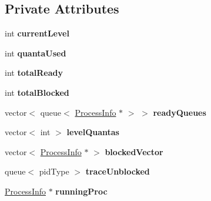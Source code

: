 \subsection*{\-Private \-Attributes}
\begin{DoxyCompactItemize}
\item 
\hypertarget{classcMultiLevel_afa779bba53744f5b3f7163c8558635ec}{int {\bfseries current\-Level}}\label{de/d3b/classcMultiLevel_afa779bba53744f5b3f7163c8558635ec}

\item 
\hypertarget{classcMultiLevel_a724793a54bbd81500c11b42e7401cf58}{int {\bfseries quanta\-Used}}\label{de/d3b/classcMultiLevel_a724793a54bbd81500c11b42e7401cf58}

\item 
\hypertarget{classcMultiLevel_a061f23961e8fea0ecff4637fe67eda8e}{int {\bfseries total\-Ready}}\label{de/d3b/classcMultiLevel_a061f23961e8fea0ecff4637fe67eda8e}

\item 
\hypertarget{classcMultiLevel_ab595c291be1900888cca01f4997604e2}{int {\bfseries total\-Blocked}}\label{de/d3b/classcMultiLevel_ab595c291be1900888cca01f4997604e2}

\item 
\hypertarget{classcMultiLevel_a3da9fc1a47e57108bb1d7113ba98a65e}{vector$<$ queue$<$ \hyperlink{structProcessInfo}{\-Process\-Info} $\ast$ $>$ $>$ {\bfseries ready\-Queues}}\label{de/d3b/classcMultiLevel_a3da9fc1a47e57108bb1d7113ba98a65e}

\item 
\hypertarget{classcMultiLevel_a97a462fada5134b60ccf0164f5ba223b}{vector$<$ int $>$ {\bfseries level\-Quantas}}\label{de/d3b/classcMultiLevel_a97a462fada5134b60ccf0164f5ba223b}

\item 
\hypertarget{classcMultiLevel_a753d5da86a2239e8fe9cfdb1976b909e}{vector$<$ \hyperlink{structProcessInfo}{\-Process\-Info} $\ast$ $>$ {\bfseries blocked\-Vector}}\label{de/d3b/classcMultiLevel_a753d5da86a2239e8fe9cfdb1976b909e}

\item 
\hypertarget{classcMultiLevel_a0d8dc829bd64d83eaab425e8efa6c0d0}{queue$<$ pid\-Type $>$ {\bfseries trace\-Unblocked}}\label{de/d3b/classcMultiLevel_a0d8dc829bd64d83eaab425e8efa6c0d0}

\item 
\hypertarget{classcMultiLevel_a04c6da4fccc3d26389e59dc2a226299a}{\hyperlink{structProcessInfo}{\-Process\-Info} $\ast$ {\bfseries running\-Proc}}\label{de/d3b/classcMultiLevel_a04c6da4fccc3d26389e59dc2a226299a}


\end{DoxyCompactItemize}
